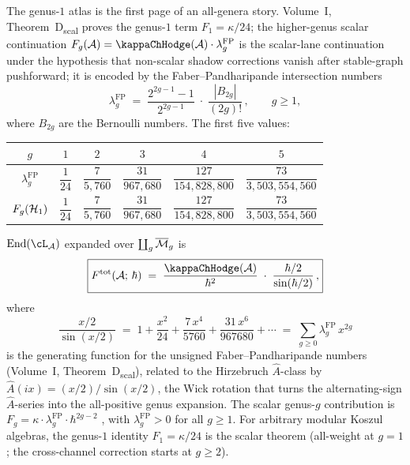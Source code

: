 The genus-$1$ atlas is the first page of an
all-genera story. Volume~I, Theorem~D\textsubscript{scal}
proves the genus-$1$ term $F_1 = \kappa/24$; the higher-genus
scalar continuation
$F_g(\cA) = \kappaChHodge(\cA) \cdot \lambda_g^{\mathrm{FP}}$
is the scalar-lane continuation under the hypothesis that
non-scalar shadow corrections vanish after stable-graph pushforward;
it is encoded by the
Faber--Pandharipande intersection
numbers
\begin{equation}\label{eq:faber-pandharipande}
\lambda_g^{\mathrm{FP}}
\;=\;
\frac{2^{2g-1} - 1}{2^{2g-1}}
\;\cdot\;
\frac{|B_{2g}|}{(2g)!}\,,
\qquad g \ge 1,
\end{equation}
where $B_{2g}$ are the Bernoulli numbers. The
first five values:
\begin{center}
\small
\renewcommand{\arraystretch}{1.2}
\begin{tabular}{cccccc}
\toprule
$g$ & $1$ & $2$ & $3$ & $4$ & $5$ \\
\midrule
$\lambda_g^{\mathrm{FP}}$ &
 $\dfrac{1}{24}$ &
 $\dfrac{7}{5{,}760}$ &
 $\dfrac{31}{967{,}680}$ &
 $\dfrac{127}{154{,}828{,}800}$ &
 $\dfrac{73}{3{,}503{,}554{,}560}$ \\[6pt]
$F_g(\mathcal{H}_1)$ &
 $\dfrac{1}{24}$ &
 $\dfrac{7}{5{,}760}$ &
 $\dfrac{31}{967{,}680}$ &
 $\dfrac{127}{154{,}828{,}800}$ &
 $\dfrac{73}{3{,}503{,}554{,}560}$ \\
\bottomrule
\end{tabular}
\end{center}

\begin{theorem}%
\label{thm:ahat-lagrangian}%
$\End(\cL_\cA)$ expanded over $\coprod_g \overline{\mathcal{M}}_g$ is
\begin{equation}\label{eq:total-free-energy}
\boxed{
F^{\mathrm{tot}}(\cA;\, \hbar)
\;=\;
\frac{\kappaChHodge(\cA)}{\hbar^2}
\;\cdot\;
\frac{\hbar/2}{\sin(\hbar/2)}\,,
}
\end{equation}
where
\begin{equation}\label{eq:ahat-series}
\frac{x/2}{\sin(x/2)}
\;=\;
1 + \frac{x^2}{24} + \frac{7\, x^4}{5760}
 + \frac{31\, x^6}{967680} + \cdots
\;=\;
\sum_{g \ge 0}
 \lambda_g^{\mathrm{FP}}\, x^{2g}
\end{equation}
is the generating function for the unsigned
Faber--Pandharipande numbers
\textup{(}Volume~I,
Theorem~D\textsubscript{scal}\textup{)},
related to the Hirzebruch $\hat{A}$-class by
$\hat{A}(ix) = (x/2)/\sin(x/2)$, the Wick rotation
that turns the alternating-sign $\hat{A}$-series into
the all-positive genus expansion.
The scalar genus-$g$ contribution is
$F_g = \kappa \cdot \lambda_g^{\mathrm{FP}} \cdot
\hbar^{2g-2}$ ,
with $\lambda_g^{\mathrm{FP}} > 0$
for all $g \ge 1$. For arbitrary modular Koszul algebras, the
genus-$1$ identity $F_1 = \kappa/24$ is the scalar theorem
(all-weight at $g = 1$; the
cross-channel correction starts at $g \ge 2$).
\end{theorem}

